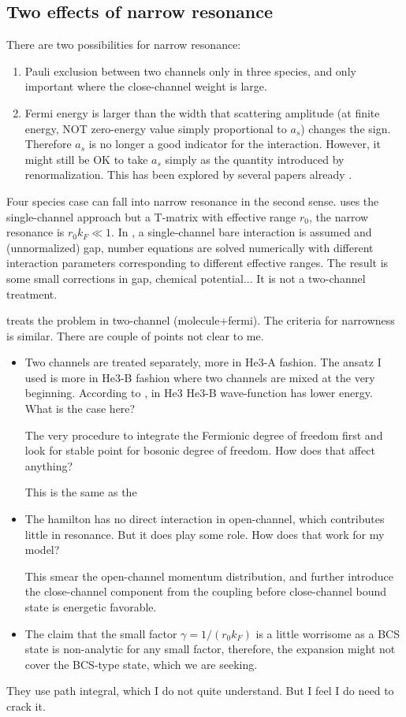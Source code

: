 \subsection{Two effects of narrow resonance}
There are two possibilities for narrow resonance:  
\begin{enumerate}
\item Pauli exclusion between two channels only in three species, and only important where the close-channel weight is large.  
\item Fermi energy is larger than the width that scattering amplitude (at finite energy, NOT zero-energy value simply proportional to $a_{s}$) changes the sign.  Therefore $a_{s}$ is no longer a good indicator for the interaction.  However, it might still be OK to take $a_{s}$ simply as the quantity introduced by renormalization.   This has been explored by several papers already \cite{NarrowJensen1,NarrowJensen,GurarieNarrow}.  
\end{enumerate}
Four species case can fall into narrow resonance in  the second sense.  \cite{NarrowJensen1,NarrowJensen} uses the single-channel approach but a T-matrix with effective range $r_{0}$, the narrow resonance is $r_{0}k_{F}\ll1$.  In \cite{NarrowJensen}, a single-channel bare interaction is assumed and (unnormalized) gap, number equations  are  solved numerically with different interaction parameters corresponding to different effective ranges. The result is some small corrections in gap, chemical potential...   It is not a two-channel treatment.  

\cite{GurarieNarrow} treats the problem in two-channel (molecule+fermi).  The criteria for narrowness is similar.  There are couple of points not clear to me.   
\begin{itemize}
\item Two channels are treated separately, more in He3-A fashion.  The ansatz I used is more in He3-B fashion where two channels are mixed at the very beginning.   According to \cite{He3B}, in He3 He3-B wave-function has lower energy.  What is the case here?

The very procedure to integrate the Fermionic degree of freedom first and look for stable point for bosonic degree of freedom.  How does that affect anything? 

This is the same as the 
\item The hamilton has no direct interaction in open-channel, which contributes little in resonance.  But it does play some role.  How does that work for my model? 

This smear the open-channel momentum distribution, and further introduce the close-channel component from the coupling before close-channel bound state is energetic favorable.  

\item The claim that the small factor $\gamma=1/(r_{0}k_{F})$ is a little worrisome as a BCS state is non-analytic for any small factor, therefore, the expansion might not cover the BCS-type state, which we are seeking.  
\end{itemize}
They use path integral, which I do not quite understand.  But I feel I do need to crack it.  

